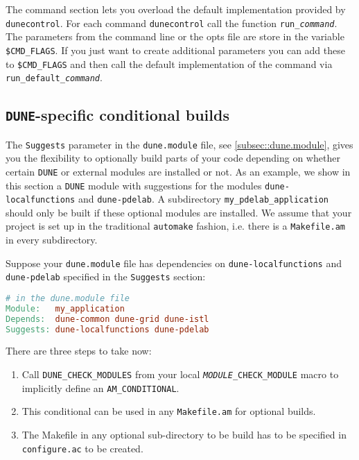\documentclass[11pt,a4paper,headinclude,footinclude,DIV16,normalheadings]{scrartcl}
\newcommand{\dune}{\texttt{DUNE}\xspace}
\newcommand{\dunecontrol}{\texttt{dunecontrol}\xspace}
\begin{document}
The command section lets you overload the default implementation
provided by \dunecontrol. For each command \dunecontrol call the
function \texttt{run\_\textit{command}}. The parameters from the
command line or the opts file are store in the variable
\texttt{\$CMD\_FLAGS}. If you just want to create additional parameters
you can add these to \texttt{\$CMD\_FLAGS} and then call the default
implementation of the command via
\texttt{run\_default\_\textit{command}}.

\subsection{\dune-specific conditional builds}

The \texttt{Suggests} parameter in the \texttt{dune.module} file,
see \ref{subsec::dune.module}, gives you the flexibility to optionally build
parts of your code depending on whether certain \dune or external modules are
installed or not. As an example, we show in this section a \dune module with suggestions
for the modules \texttt{dune-localfunctions} and \texttt{dune-pdelab}.
A subdirectory \texttt{my\_pdelab\_application} should only be built if these optional modules
are installed. We assume that your project is set up in the traditional
\texttt{automake} fashion, i.e. there is a \texttt{Makefile.am} in every subdirectory.

Suppose your \texttt{dune.module} file has dependencies on \texttt{dune-localfunctions}
and \texttt{dune-pdelab} specified in the \texttt{Suggests} section:
\begin{lstlisting}[language=make]
# in the dune.module file
Module:   my_application
Depends:  dune-common dune-grid dune-istl
Suggests: dune-localfunctions dune-pdelab
\end{lstlisting}
There are three steps to take now:
\begin{enumerate}
  \item Call \texttt{DUNE\_CHECK\_MODULES} from your local \texttt{\textit{MODULE}\_CHECK\_MODULE}
    macro to implicitly define an \texttt{AM\_CONDITIONAL}.
  \item This conditional can be used in any \texttt{Makefile.am} for optional builds.
  \item The Makefile in any optional sub-directory to be build has to be
    specified in \texttt{configure.ac} to be created.
\end{enumerate}
\end{document}
